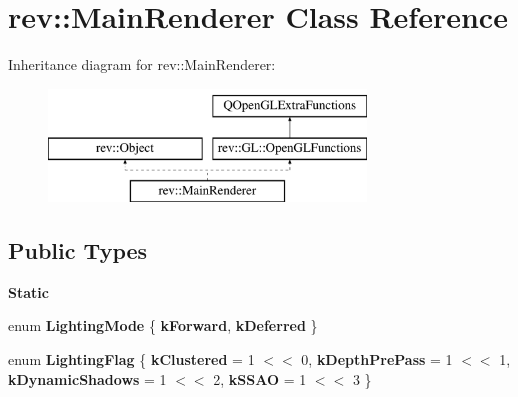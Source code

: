\hypertarget{classrev_1_1_main_renderer}{}\section{rev\+::Main\+Renderer Class Reference}
\label{classrev_1_1_main_renderer}
Inheritance diagram for rev\+::Main\+Renderer\+:\begin{figure}[H]
\begin{center}
\leavevmode
\includegraphics[height=3.000000cm]{classrev_1_1_main_renderer}
\end{center}
\end{figure}
\subsection*{Public Types}
\begin{Indent}\textbf{ Static}\par
\begin{DoxyCompactItemize}
\item 
\mbox{\label{classrev_1_1_main_renderer_a5cda9287436376d54477ebb27a19549c}} 
enum {\bfseries Lighting\+Mode} \{ {\bfseries k\+Forward}, 
{\bfseries k\+Deferred}
 \}
\item 
\mbox{\label{classrev_1_1_main_renderer_a95e109bdddf87ce1ed32f7445f1c18c0}} 
enum {\bfseries Lighting\+Flag} \{ {\bfseries k\+Clustered} = 1 $<$$<$ 0, 
{\bfseries k\+Depth\+Pre\+Pass} = 1 $<$$<$ 1, 
{\bfseries k\+Dynamic\+Shadows} = 1 $<$$<$ 2, 
{\bfseries k\+S\+S\+AO} = 1 $<$$<$ 3
 \}
\end{DoxyCompactItemize}
\end{Indent}
